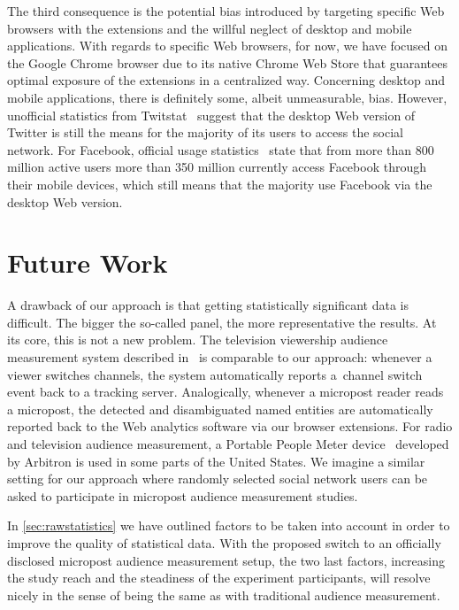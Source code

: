 \documentclass{iosart2c}
\begin{document}
The third consequence is the potential bias introduced by targeting specific Web browsers with the extensions and the willful neglect of desktop and mobile applications. 
With regards to specific Web browsers, for now, we have focused on the Google Chrome browser due to its native Chrome Web Store that guarantees optimal exposure of the extensions in a centralized way.
Concerning desktop and mobile applications, there is definitely some, albeit unmeasurable, bias.
However, unofficial statistics from Twitstat~\cite{twitstat} suggest that the desktop Web version of Twitter is still the means for the majority of its users to access the social network.
For Facebook, official usage statistics~\cite{facebookstats} state that from more than 800 million active users more than 350 million currently access Facebook through their mobile devices, which still means that the majority use Facebook via the desktop Web version.

\section{Future Work} \label{sec:futurework}
A drawback of our approach is that getting statistically significant data is difficult.
The bigger the so-called panel, the more representative the results.
At its core, this is not a new problem.
The television viewership audience measurement system described in~\cite{patent:20100011389} is comparable to our approach:
whenever a viewer switches channels, the system automatically reports a~channel switch event back to a tracking server.
Analogically, whenever a micropost reader reads a micropost, the detected and disambiguated named entities are automatically reported back to the Web analytics software via our browser extensions.
For radio and television audience measurement, a Portable People Meter device~\cite{PortablePeopleMeter} developed by Arbitron is used in some parts of the United States.
We imagine a similar setting for our approach where randomly selected social network users can be asked to participate in micropost audience measurement studies.

In \autoref{sec:rawstatistics} we have outlined factors to be taken into account in order to improve the quality of statistical data.
With the proposed switch to an officially disclosed micropost audience measurement setup, the two last factors, increasing the study reach and the steadiness of the experiment participants, will resolve nicely in the sense of being the same as with traditional audience measurement.
\end{document}
